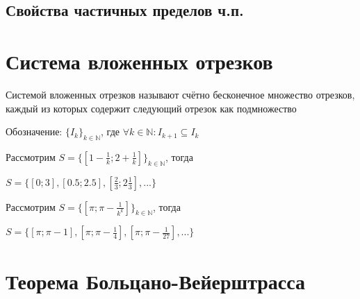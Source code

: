 \subsection{Свойства частичных пределов ч.п.}


\section{Система вложенных отрезков}

{
    Системой вложенных отрезков называют счётно бесконечное множество отрезков, каждый из которых содержит
    следующий отрезок как подмножество

    Обозначение: $ \{ I_k \}_{k \in \mathbb{N}} $, где $ \forall k \in \mathbb{N}: I_{k+1} \subseteq I_{k} $
}

\mcex{}
{
    Рассмотрим $ S = \{ [1 - \frac{1}{k}; 2 + \frac{1}{k}] \}_{k \in \mathbb{N}} $, тогда

    $ S = \{ [0; 3], [0.5; 2.5], [\frac{2}{3}; 2\frac{1}{3}], ... \} $

    Рассмотрим $ S = \{ [\pi; \pi - \frac{1}{k^k}] \}_{k \in \mathbb{N}} $, тогда

    $ S = \{ [\pi; \pi - 1], [\pi; \pi - \frac{1}{4}], [\pi; \pi - \frac{1}{27}], ... \} $
}

\section{Теорема Больцано-Вейерштрасса}

